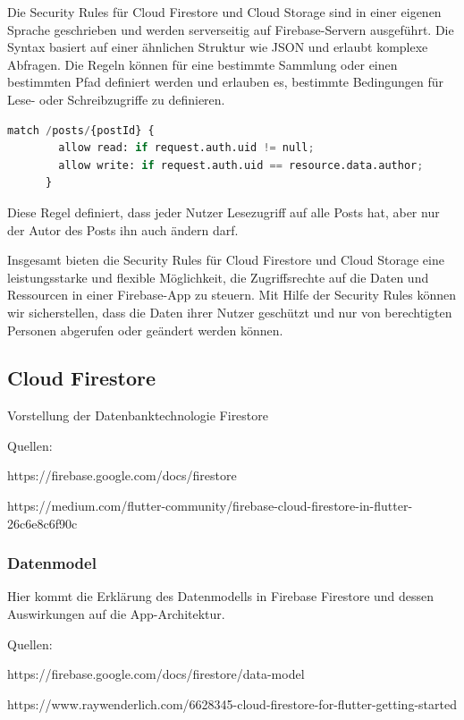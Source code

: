 Die Security Rules für Cloud Firestore und Cloud Storage sind in einer eigenen Sprache geschrieben und werden serverseitig auf Firebase-Servern ausgeführt. Die Syntax basiert auf einer ähnlichen Struktur wie JSON und erlaubt komplexe Abfragen. Die Regeln können für eine bestimmte Sammlung oder einen bestimmten Pfad definiert werden und erlauben es, bestimmte Bedingungen für Lese- oder Schreibzugriffe zu definieren.


\begin{lstlisting}[language=Python,caption=Security Rules Beispiel]
    match /posts/{postId} {
        allow read: if request.auth.uid != null;
        allow write: if request.auth.uid == resource.data.author;
      }
\end{lstlisting}

Diese Regel definiert, dass jeder Nutzer Lesezugriff auf
alle Posts hat, aber nur der Autor des Posts ihn auch ändern
darf.

Insgesamt bieten die Security Rules für Cloud Firestore und Cloud Storage eine leistungsstarke und flexible Möglichkeit, die Zugriffsrechte auf die Daten und Ressourcen in einer Firebase-App zu steuern. Mit Hilfe der Security Rules können wir sicherstellen, dass die Daten ihrer Nutzer geschützt und nur von berechtigten Personen abgerufen oder geändert werden können.



\subsection{Cloud Firestore}

Vorstellung der Datenbanktechnologie Firestore

Quellen:

https://firebase.google.com/docs/firestore

https://medium.com/flutter-community/firebase-cloud-firestore-in-flutter-26c6e8c6f90c

\subsubsection{Datenmodel}

Hier kommt die Erklärung des Datenmodells in Firebase Firestore und dessen Auswirkungen auf die App-Architektur.

Quellen:

https://firebase.google.com/docs/firestore/data-model

https://www.raywenderlich.com/6628345-cloud-firestore-for-flutter-getting-started

